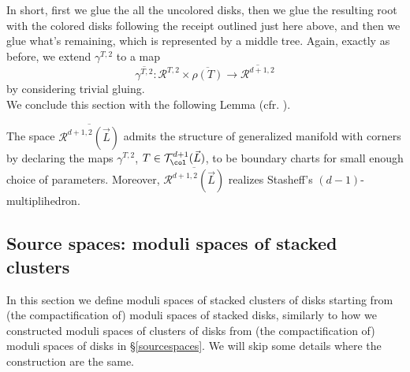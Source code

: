 	In short, first we glue the all the uncolored disks, then we glue the resulting root with the colored disks following the receipt outlined just here above, and then we glue what's remaining, which is represented by a middle tree.
	Again, exactly as before, we extend $\gamma^{T,2}$ to a map $$\overline{\gamma^{T,2}}\colon \mathcal{R}^{T,2}\times \overline{\rho(T)}\longrightarrow \overline{\mathcal{R}^{d+1,2}}$$ by considering trivial gluing.\\
	
	We conclude this section with the following Lemma (cfr. \cite{Mau2010GeometricMultiplihedra, Sylvan2019OnCategories}).
	\begin{lemma}
		The space $\overline{\mathcal{R}^{d+1,2}(\vec{L})}$ admits the structure of generalized manifold with corners by declaring the maps $\gamma^{T,2}$, $T\in \mathcal{T}^{d+1}_\col(\vec{L})$, to be boundary charts for small enough choice of parameters. Moreover, $\overline{\mathcal{R}^{d+1,2}(\vec{L})}$ realizes Stasheff's $(d-1)$-multiplihedron.
	\end{lemma}
	
	\subsection{Source spaces: moduli spaces of stacked clusters}
	In this section we define moduli spaces of stacked clusters of disks starting from (the compactification of) moduli spaces of stacked disks, similarly to how we constructed moduli spaces of clusters of disks from (the compactification of) moduli spaces of disks in \S \ref{sourcespaces}. We will skip some details where the construction are the same.\\
	
